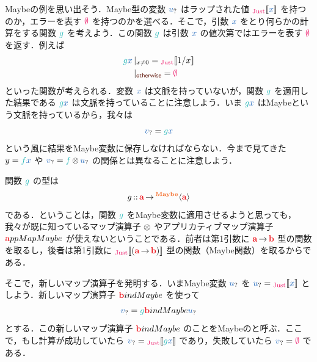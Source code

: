 \documentclass[a5paper,twoside,fleqn,draft]{jsbook}
\begin{document}
Maybeの例を思い出そう．Maybe型の変数 $\hMaybeVar{u}$ はラップされた値 $\hJustWith{\hVar{x}}$ を持つのか，エラーを表す $\hNothing$ を持つのかを選べる．そこで，引数 $\hVar{x}$ をとり何らかの計算をする関数 $\hFunc{g}$ を考えよう．この関数 $\hFunc{g}$ は引数 $\hVar{x}$ の値次第ではエラーを表す $\hNothing$ を返す．例えば
\begin{equation}
  \begin{aligned}
    \hFunc{g}\hVar{x}&\hGuard{x\neq0}=\hJustWith{1/x}\\
    &\hGuard{\hOtherwise}=\hNothing
  \end{aligned}
\end{equation}
といった関数が考えられる．変数 $\hVar{x}$ は文脈を持っていないが，関数 $\hFunc{g}$ を適用した結果である $\hFunc{g}\hVar{x}$ は文脈を持っていることに注意しよう．いま $\hFunc{g}\hVar{x}$ はMaybeという文脈を持っているから，我々は
\begin{equation}
\hMaybeVar{v}=\hFunc{g}\hVar{x}
\end{equation}
という風に結果をMaybe変数に保存しなければならない．今まで見てきた $y=\hFunc{f}\hVar{x}$ や $\hMaybeVar{v}=\hFunc{f}\hMaybeMap\hMaybeVar{u}$ の関係とは異なることに注意しよう．

関数 $\hFunc{g}$ の型は
\begin{equation}
  g\hIsTypeOf\mProjEXP{\hTypeName{a} }{\hMaybeConstruct{\hTypeName{a}}}
\end{equation}
である．ということは，関数 $\hFunc{g}$ をMaybe変数に適用させるようと思っても，我々が既に知っているマップ演算子 $\operatorname{\otimes}$ やアプリカティブマップ演算子 $\hTypeName{a}ppMapMaybe$ が使えないということである．前者は第1引数に $\mProjEXP{\hTypeName{a} }{\hTypeName{b} }$ 型の関数を取るし，後者は第1引数に $\hJustWith{(\mProjEXP{\hTypeName{a} }{\hTypeName{b} })}$ 型の関数（Maybe関数）を取るからである．


そこで，新しいマップ演算子を発明する．いまMaybe変数 $\hMaybeVar{u}$ を $\hMaybeVar{u}=\hJustWith{\hVar{x}}$ としよう．新しいマップ演算子 $\hTypeName{b}indMaybe$ を使って
\begin{equation}
  \hMaybeVar{v}=\hFunc{g}\hTypeName{b}indMaybe\hMaybeVar{u}
\end{equation}
とする．この新しいマップ演算子 $\hTypeName{b}indMaybe$ のことをMaybeのと呼ぶ．ここで，もし計算が成功していたら $\hMaybeVar{v}=\hJustWith{\hFunc{g}\hVar{x}}$ であり，失敗していたら $\hMaybeVar{v}=\hNothing$ である．
\end{document}
